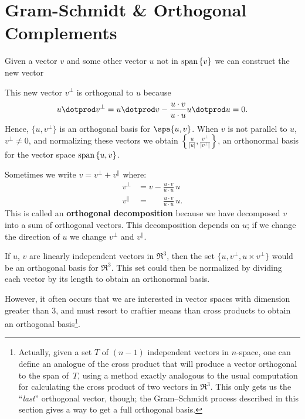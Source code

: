 %



\section{Gram-Schmidt \& Orthogonal Complements}\label{gramschmidt}


Given a vector $v$ and some other vector $u$ not in  $ {\rm span}\, \{v\} $ we can construct the new vector 
\begin{center}
\hypertarget{projectionpic}{}
\end{center}
This new vector $v^\perp$ is orthogonal to $u$ because 
\[
u\dotprod v^\perp = u\dotprod v - \frac{u\cdot v}{u\cdot u}u\dotprod u = 0.
\]
Hence, $\{u, v^\perp\}$ is an orthogonal basis for $\spa \{u,v\}$.  When $v$ is not parallel to $u$, $v^\perp \neq 0$, and normalizing these vectors we obtain $\left\{\frac{u}{|u|}, \frac{v^\perp}{|v^\perp|} \right\}$, an orthonormal basis for the vector space ${\rm span}\, \{u,v\}$.

Sometimes we write $v = v^\perp + v^\parallel$ where:
\begin{align*}
v^\perp &= v-\frac{u\cdot v}{u\cdot u}\, u \\[1mm]
v^\parallel &= \phantom{v-}\frac{u\cdot v}{u\cdot u}\, u.
\end{align*}
This is called an {\bfseries orthogonal decomposition} because we have decomposed $v$ into a sum of orthogonal vectors.  This decomposition depends on $u$; if we change the direction of $u$ we change $v^\perp$ and $v^\parallel$.

If $u$, $v$ are linearly independent vectors in $\Re^3$, then the set $\{u, v^\perp, u\times v^\perp \}$ would be an orthogonal basis for $\Re^3$.  This set could then be normalized by dividing each vector by its length to obtain an orthonormal basis.

However, it often occurs that we are interested in vector spaces with dimension greater than $3$, and must resort to craftier means than cross products to obtain an orthogonal basis\footnote{Actually, given a set $T$ of $(n-1)$ independent vectors in $n$-space, one can define an analogue of the cross product that will produce a vector orthogonal to the span of~$T$, using a method exactly analogous to the usual computation for calculating the cross product of two vectors in $\Re^3$.  This only gets us the ``\emph{last}'' orthogonal vector, though; the Gram--Schmidt process described in this section gives a way to get a full orthogonal basis.}.

